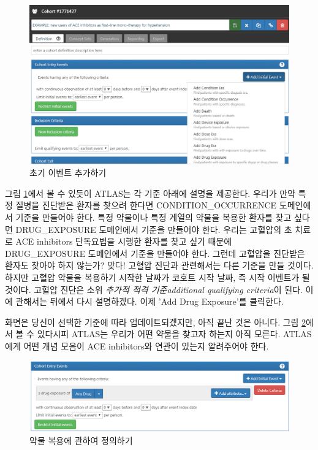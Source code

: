 \documentclass[10.5pt]{book}
\theoremstyle{definition}
\theoremstyle{definition}
\theoremstyle{definition}
\theoremstyle{remark}
\begin{document}
\begin{figure}

{\centering \includegraphics[width=1\linewidth]{images/Cohorts/ATLAS-initialevent} 

}

\caption{초기 이벤트 추가하기}\label{fig:ATLASinitialevent}
\end{figure}

그림 \ref{fig:ATLASinitialevent}에서 볼 수 있듯이 ATLAS는 각 기준 아래에
설명을 제공한다. 우리가 만약 특정 질병을 진단받은 환자를 찾으려 한다면
CONDITION\_OCCURRENCE 도메인에서 기준을 만들어야 한다. 특정 약물이나
특정 계열의 약물을 복용한 환자를 찾고 싶다면 DRUG\_EXPOSURE 도메인에서
기준을 만들어야 한다. 우리는 고혈압의 초 치료로 ACE inhibitors
단독요법을 시행한 환자를 찾고 싶기 때문에 DRUG\_EXPOSURE 도메인에서
기준을 만들어야 한다. 그런데 고혈압을 진단받은 환자도 찾아야 하지
않는가? 맞다! 고혈압 진단과 관련해서는 다른 기준을 만들 것이다. 하지만
고혈압 약물을 복용하기 시작한 날짜가 코호트 시작 날짜, 즉 시작 이벤트가
될 것이다. 고혈압 진단은 소위 \emph{추가적 적격 기준additional
qualifying criteria}이 된다. 이에 관해서는 뒤에서 다시 설명하겠다. 이제
'Add Drug Exposure'를 클릭한다.

화면은 당신이 선택한 기준에 따라 업데이트되겠지만, 아직 끝난 것은
아니다. 그림 \ref{fig:ATLASdrugexposure}에서 볼 수 있다시피 ATLAS는
우리가 어떤 약물을 찾고자 하는지 아직 모른다. ATLAS에게 어떤 개념 모음이
ACE inhibitors와 연관이 있는지 알려주어야 한다.

\begin{figure}

{\centering \includegraphics[width=1\linewidth]{images/Cohorts/ATLAS-drugexposure} 

}

\caption{약물 복용에 관하여 정의하기}\label{fig:ATLASdrugexposure}
\end{figure}
\end{document}
